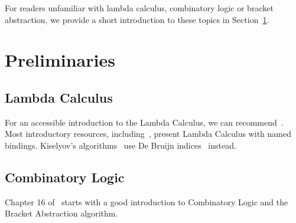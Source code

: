\documentclass[conference]{IEEEtran}
\begin{document}
For readers unfamiliar with lambda calculus, combinatory logic or bracket abstraction, we provide a short introduction to these topics in Section~\ref{sec:prelim}.

\section{Preliminaries}
\label{sec:prelim}
\subsection{Lambda Calculus}
For an accessible introduction to the Lambda Calculus, we can recommend~\cite{rojas_tutorial_2015}.
Most introductory resources, including~\cite{rojas_tutorial_2015}, present Lambda Calculus with named bindings.
Kiselyov's algorithms~\cite{kiselyov_lambda_2018} use De Bruijn indices~\cite{de_bruijn_lambda_1972} instead.

%
%
%
\subsection{Combinatory Logic}
Chapter 16 of~\cite{spj_impl} starts with a good introduction to Combinatory Logic and the Bracket Abstraction algorithm.
\end{document}
